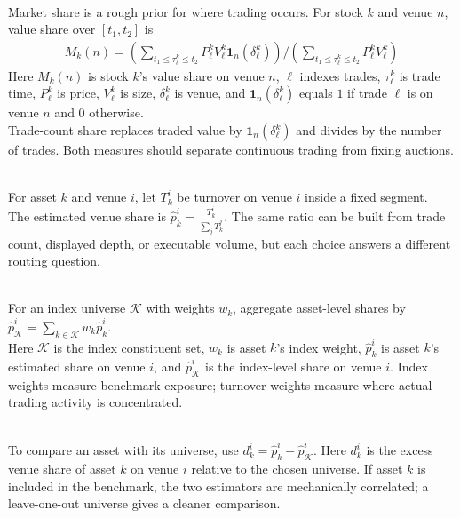 \begin{definition} \\
Market share is a rough prior for where trading occurs. For stock $k$ and venue $n$, value share over $[t_1,t_2]$ is
\begin{align}
M_k(n)= \left( \sum\limits_{t_1\leq \tau_\ell^k\leq t_2}P_\ell^kV_\ell^k\mathbf{1}_n(\delta_\ell^k) \right) / \left( \sum\limits_{t_1\leq \tau_\ell^k\leq t_2}P_\ell^kV_\ell^k \right) \nonumber
\end{align}
Here $M_k(n)$ is stock $k$'s value share on venue $n$, $\ell$ indexes trades, $\tau_\ell^k$ is trade time, $P_\ell^k$ is price, $V_\ell^k$ is size, $\delta_\ell^k$ is venue, and $\mathbf{1}_n(\delta_\ell^k)$ equals $1$ if trade $\ell$ is on venue $n$ and $0$ otherwise.\\
Trade-count share replaces traded value by $\mathbf{1}_n(\delta_\ell^k)$ and divides by the number of trades. Both measures should separate continuous trading from fixing auctions.
\end{definition}

\begin{model} \\
For asset $k$ and venue $i$, let $T_k^i$ be turnover on venue $i$ inside a fixed segment.\\
The estimated venue share is $\hat{p}_k^i=\frac{T_k^i}{\sum\limits_j T_k^j}$. The same ratio can be built from trade count, displayed depth, or executable volume, but each choice answers a different routing question.
\end{model}

\begin{model} \\
For an index universe $\mathcal{K}$ with weights $w_k$, aggregate asset-level shares by $\hat{p}_{\mathcal{K}}^i=\sum\limits_{k\in\mathcal{K}}w_k\hat{p}_k^i$.\\
Here $\mathcal{K}$ is the index constituent set, $w_k$ is asset $k$'s index weight, $\hat{p}_k^i$ is asset $k$'s estimated share on venue $i$, and $\hat{p}_{\mathcal{K}}^i$ is the index-level share on venue $i$. Index weights measure benchmark exposure; turnover weights measure where actual trading activity is concentrated.
\end{model}

\begin{practitionernote} \\
To compare an asset with its universe, use $d_k^i=\hat{p}_k^i-\hat{p}_{\mathcal{K}}^i$. Here $d_k^i$ is the excess venue share of asset $k$ on venue $i$ relative to the chosen universe. If asset $k$ is included in the benchmark, the two estimators are mechanically correlated; a leave-one-out universe gives a cleaner comparison.
\end{practitionernote}

